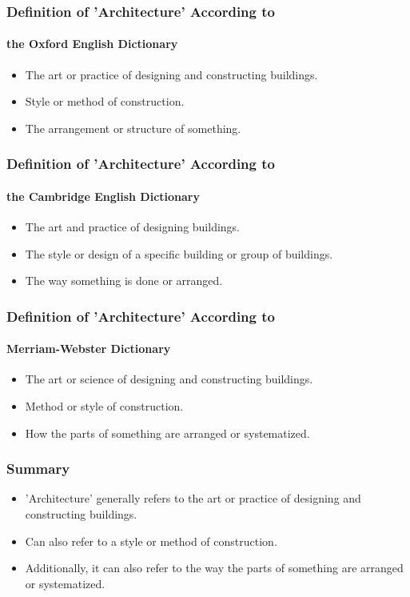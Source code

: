 \documentclass[aspectratio=169, table]{beamer}
\begin{document}
    \begin{frame}
        \frametitle{Definition of 'Architecture' According to}
        \framesubtitle{the Oxford English Dictionary}
        \begin{itemize}
            \item The art or practice of designing and constructing buildings.
            \item Style or method of construction.
            \item The arrangement or structure of something.
        \end{itemize}
    \end{frame}

    \begin{frame}
        \frametitle{Definition of 'Architecture' According to}
        \framesubtitle{the Cambridge English Dictionary}
        \begin{itemize}
            \item The art and practice of designing buildings.
            \item The style or design of a specific building or group of buildings.
            \item The way something is done or arranged.
        \end{itemize}
    \end{frame}

    \begin{frame}
        \frametitle{Definition of 'Architecture' According to}
        \framesubtitle{Merriam-Webster Dictionary}
        \begin{itemize}
            \item The art or science of designing and constructing buildings.
            \item Method or style of construction.
            \item How the parts of something are arranged or systematized.
        \end{itemize}
    \end{frame}

    \begin{frame}
        \frametitle{Summary}
        \begin{itemize}
            \item 'Architecture' generally refers to the art or practice of designing and constructing buildings.
            \item Can also refer to a style or method of construction.
            \item Additionally, it can also refer to the way the parts of something are arranged or systematized.
        \end{itemize}
    \end{frame}
\end{document}
